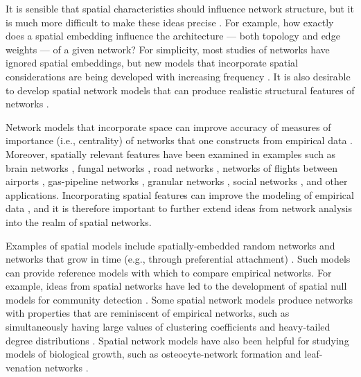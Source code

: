\documentclass[%
 reprint,
 amsmath,amssymb,
 aps,
]{revtex4-1}
\begin{document}
It is sensible that spatial characteristics should influence network structure, but it is much more difficult to make these ideas precise \cite{barthelemy}. For example, how exactly does a spatial embedding influence the architecture --- both topology and edge weights --- of a given network? For simplicity, most studies of networks have ignored spatial embeddings, but new models that incorporate spatial considerations are being developed with increasing frequency \cite{barthelemy}. It is also desirable to develop spatial network models that can produce realistic structural features of networks \cite{geometry-review,boguna2019}.

Network models that incorporate space can improve {\color{red}accuracy of} measures of importance (i.e., centrality) of networks that one constructs from empirical data \cite{spatial1, air-traffic,sarkar2019}. Moreover, spatially relevant features have been examined in examples such as brain networks \cite{braingrowth1, braingrowth2}, fungal networks \cite{fungal_data}, road networks \cite{road_data, spatial1, barbosa, boeing2018multi}, networks of flights between airports \cite{air-traffic}, gas-pipeline networks \cite{spatialefficiency}, granular networks \cite{berthier2019,nauer2019}, social networks \cite{danchev2018,sarkar2019}, and other applications. Incorporating spatial features can improve the modeling of empirical data \cite{barthelemy}, and it is therefore important to further extend ideas from network analysis into the realm of spatial networks.

Examples of spatial models include spatially-embedded random networks \cite{penrose-rgg, geographical_threshold} and networks that grow in time (e.g., through preferential attachment) \cite{mean_field_evolving_spatial, SPA1, spatial1}. Such models can provide reference models with which to compare empirical networks. For example, ideas from spatial networks have led to the development of spatial null models for community detection \cite{community1, community2}. Some spatial network models produce networks with properties that are reminiscent of empirical networks, such as simultaneously having large values of clustering coefficients and heavy-tailed degree distributions \cite{geometric_preferential_attachment, geographical_threshold2}. Spatial network models have also been helpful for studying models of biological growth, such as osteocyte-network formation \cite{mean_field_evolving_spatial} and leaf-venation networks \cite{leaf_optimization}.
\end{document}
